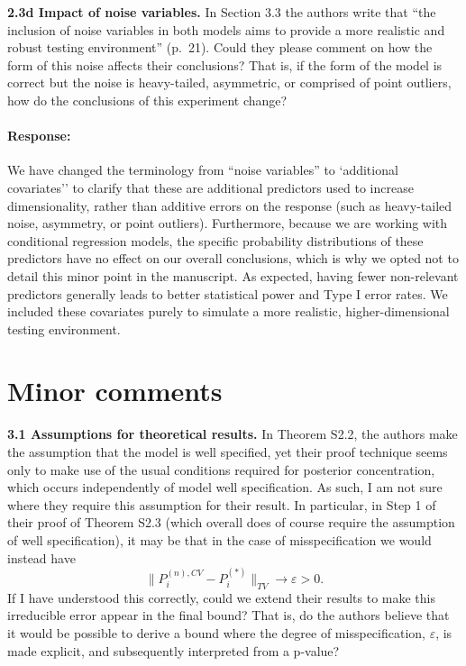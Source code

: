 \documentclass[11pt]{article}
\newcommand*{\mybox}[2]{%
  \par\medskip\noindent
  \colorbox{#1!30}{\parbox{.98\linewidth}{#2}}%
  \par\medskip
}
\begin{document}

\mybox{gray}{\textbf{2.3d Impact of noise variables.} In Section 3.3 the authors write that ``the inclusion of noise variables in both models aims to provide a more realistic and robust testing environment'' (p.~21). Could they please comment on how the form of this noise affects their conclusions? That is, if the form of the model is correct but the noise is heavy-tailed, asymmetric, or comprised of point outliers, how do the conclusions of this experiment change?}

\paragraph{Response:}

We have changed the terminology from ``noise variables'' to `additional covariates'' to clarify that these are additional predictors used to increase dimensionality, rather than additive errors on the response (such as heavy-tailed noise, asymmetry, or point outliers). Furthermore, because we are working with conditional regression models, the specific probability distributions of these predictors have no effect on our overall conclusions, which is why we opted not to detail this minor point in the manuscript. As expected, having fewer non-relevant predictors generally leads to better statistical power and Type I error rates. We included these  covariates purely to simulate a more realistic, higher-dimensional testing environment.



\section*{Minor comments}

\mybox{gray}{\textbf{3.1 Assumptions for theoretical results.} In Theorem S2.2, the authors make the assumption that the model is well specified, yet their proof technique seems only to make use of the usual conditions required for posterior concentration, which occurs independently of model well specification. As such, I am not sure where they require this assumption for their result. In particular, in Step 1 of their proof of Theorem S2.3 (which overall does of course require the assumption of well specification), it may be that in the case of misspecification we would instead have
\[
\|P_i^{(n),CV} - P_i^{(*)}\|_{TV} \to \varepsilon > 0.
\]
If I have understood this correctly, could we extend their results to make this irreducible error appear in the final bound? That is, do the authors believe that it would be possible to derive a bound where the degree of misspecification, $\varepsilon$, is made explicit, and subsequently interpreted from a p-value?
}
\end{document}
